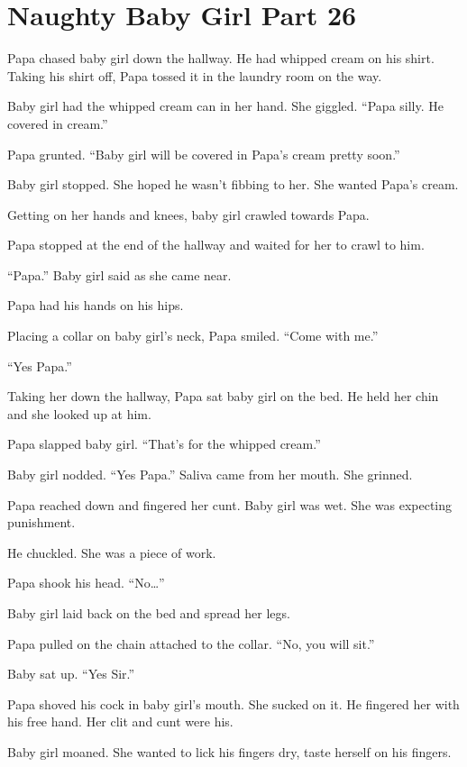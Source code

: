 \section{Naughty Baby Girl Part 26}

    Papa chased baby girl down the hallway. He had whipped cream on his shirt. Taking his shirt off, Papa tossed it in the laundry room on the way.

    Baby girl had the whipped cream can in her hand. She giggled. “Papa silly. He covered in cream.”

    Papa grunted. “Baby girl will be covered in Papa’s cream pretty soon.”

    Baby girl stopped. She hoped he wasn’t fibbing to her. She wanted Papa’s cream.

    Getting on her hands and knees, baby girl crawled towards Papa.

    Papa stopped at the end of the hallway and waited for her to crawl to him.

    “Papa.” Baby girl said as she came near.

    Papa had his hands on his hips.

    Placing a collar on baby girl's neck, Papa smiled. “Come with me.”

    “Yes Papa.”

    Taking her down the hallway, Papa sat baby girl on the bed. He held her chin and she looked up at him.

    Papa slapped baby girl. “That’s for the whipped cream.”

    Baby girl nodded. “Yes Papa.” Saliva came from her mouth. She grinned.

    Papa reached down and fingered her cunt. Baby girl was wet. She was expecting punishment.

    He chuckled. She was a piece of work.

    Papa shook his head. “No…”

    Baby girl laid back on the bed and spread her legs.

    Papa pulled on the chain attached to the collar. “No, you will sit.”

    Baby sat up. “Yes Sir.”

    Papa shoved his cock in baby girl’s mouth. She sucked on it. He fingered her with his free hand. Her clit and cunt were his.

    Baby girl moaned. She wanted to lick his fingers dry, taste herself on his fingers.

